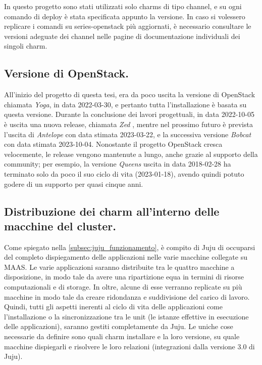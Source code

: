In questo progetto sono stati utilizzati solo charms di tipo channel, e su ogni comando di deploy è stata specificata appunto la versione.
% 
In caso si volessero replicare i comandi su series-openstack più aggiornati, è necessario consultare le versioni adeguate dei channel nelle pagine di documentazione individuali dei singoli charm.



\subsection{Versione di OpenStack.}\label{sec:openstack_version} 
All'inizio del progetto di questa tesi, era da poco uscita la versione di OpenStack chiamata \emph{Yoga}, in data 2022-03-30, e pertanto tutta l'installazione è basata su questa versione.
% 
Durante la conclusione dei lavori progettuali, in data 2022-10-05 è uscita una nuova release, chiamata \emph{Zed} , mentre nel prossimo futuro è prevista l'uscita di \emph{Antelope} con data stimata 2023-03-22, e la successiva versione \emph{Bobcat} con data stimata 2023-10-04.
%
Nonostante il progetto OpenStack cresca velocemente, le release vengono mantenute a lungo, anche grazie al supporto della community;
% 
per esempio, la versione \emph{Queens} uscita in data 2018-02-28 ha terminato solo da poco il suo ciclo di vita (2023-01-18), avendo 
quindi potuto godere di un supporto per quasi cinque anni.



\subsection{Distribuzione dei charm all'interno delle macchine del cluster.}
Come spiegato nella \cref{subsec:juju_funzionamento}, è compito di Juju di occuparsi del completo dispiegamento delle applicazioni nelle varie macchine collegate su MAAS.
% 
Le varie applicazioni saranno distribuite tra le quattro macchine a disposizione, in modo tale da avere una ripartizione equa in termini di risorse computazionali e di storage.
% 
In oltre, alcune di esse verranno replicate su più macchine in modo tale da creare ridondanza e suddivisione del carico di lavoro.
% 
Quindi, tutti gli aspetti inerenti al ciclo di vita delle applicazioni come l'installazione o la sincronizzazione tra le unit (le istanze effettive in esecuzione delle applicazioni), saranno gestiti completamente da Juju.
% 
Le uniche cose necessarie da definire sono quali charm installare e la loro versione, su quale macchine dispiegarli e risolvere le loro relazioni (integrazioni dalla versione 3.0 di Juju).

